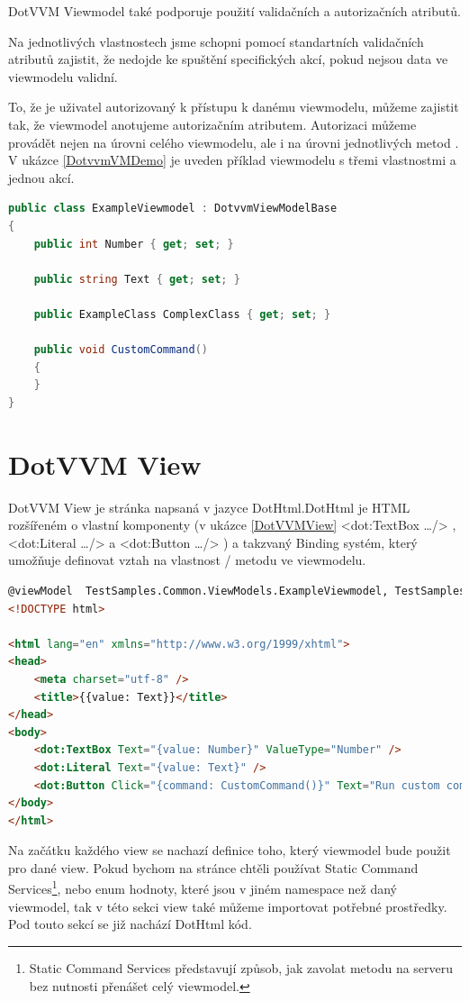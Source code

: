 DotVVM Viewmodel také podporuje použití validačních a autorizačních atributů.

Na jednotlivých vlastnostech jsme schopni pomocí standartních validačních atributů zajistit, že nedojde ke spuštění specifických akcí, pokud nejsou data ve viewmodelu validní\cite{DotVVM-Validation}. 

To, že je uživatel autorizovaný k přístupu k danému viewmodelu, můžeme zajistit tak, že viewmodel anotujeme autorizačním atributem. Autorizaci můžeme provádět nejen na úrovni celého viewmodelu, ale i na úrovni jednotlivých metod \cite{DotvvmAuth}. V ukázce \ref{DotvvmVMDemo} je uveden příklad viewmodelu s třemi vlastnostmi a jednou akcí.

\begin{lstlisting}[language=c#, caption=Ukázka DotVVM Viewmodelu,label=DotvvmVMDemo,captionpos=t]
public class ExampleViewmodel : DotvvmViewModelBase
{
    public int Number { get; set; }

    public string Text { get; set; }

    public ExampleClass ComplexClass { get; set; }

    public void CustomCommand() 
    {
    }
}
\end{lstlisting}


\section{DotVVM View}
DotVVM View je stránka napsaná v jazyce DotHtml.DotHtml je HTML rozšířeném o vlastní komponenty (v ukázce \ref{DotVVMView} <dot:TextBox \ldots /> , <dot:Literal \ldots /> a <dot:Button \ldots /> ) a takzvaný Binding systém, který umožňuje definovat vztah na vlastnost / metodu ve viewmodelu.

\begin{lstlisting}[language=html, caption=Ukázka DotHtml,captionpos=t,label=DotVVMView]
@viewModel  TestSamples.Common.ViewModels.ExampleViewmodel, TestSamples.Common
<!DOCTYPE html>

<html lang="en" xmlns="http://www.w3.org/1999/xhtml">
<head>
    <meta charset="utf-8" />
    <title>{{value: Text}}</title>
</head>
<body>
    <dot:TextBox Text="{value: Number}" ValueType="Number" />
    <dot:Literal Text="{value: Text}" />
    <dot:Button Click="{command: CustomCommand()}" Text="Run custom command" />
</body>
</html>
\end{lstlisting}

    Na začátku každého view se nachazí definice toho, který viewmodel bude použit pro dané view. Pokud bychom na stránce chtěli používat Static Command Services\footnote{Static Command Services představují způsob, jak zavolat metodu na serveru bez nutnosti přenášet celý viewmodel.}, nebo enum hodnoty, které jsou v jiném namespace než daný viewmodel, tak v této sekci view také můžeme importovat potřebné prostředky. Pod touto sekcí se již nachází DotHtml kód.
    
